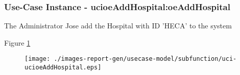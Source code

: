 \subsubsection{Use-Case Instance - ucioeAddHospital:oeAddHospital}

The Administrator Jose add the Hospital with ID 'HECA' to the system		  
\begin{operationmodel}

\end{operationmodel} 

Figure \ref{fig:lu.uni.lassy.excalibur.examples.icrash-RE-UC-uci-ucioeAddHospital}

\begin{figure}[htbp]
\begin{center}

\texttt{[image: ./images-report-gen/usecase-model/subfunction/uci-ucioeAddHospital.eps]}
\end{center}
\caption[lu.uni.lassy.excalibur.examples.icrash Sequence Diagram: uci-ucioeAddHospital]{}
\label{fig:lu.uni.lassy.excalibur.examples.icrash-RE-UC-uci-ucioeAddHospital}
\end{figure}
\vspace{0.5cm}
